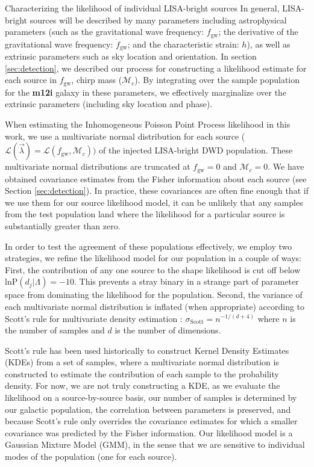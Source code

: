 \documentclass[twocolumn]{aastex631}
\newcommand*{\pprob}{\mathrm{P}}
\newcommand*{\gwL}{\mathcal{L}}
\newcommand*{\BinaryParameters}{\vec{\lambda}}
\newcommand*{\FormationParameters}{\Lambda}
\newcommand*{\gwdetj}{d_j}
\newcommand*\mc{\mathcal{M}_c}
\newcommand*{\fgw}{f_{\mathrm{gw}}}
\begin{document}
\begin{subsection}{Characterizing the likelihood of individual LISA-bright sources}
In general, LISA-bright sources will be described by
    many parameters including astrophysical parameters
    (such as the gravitational wave frequency: $\fgw$;
    the derivative of the gravitational wave frequency: $\dot{f}_{\mathrm{gw}}$;
    and the characteristic strain: $h$),
    as well as extrinsic parameters such as sky location
    and orientation.
In section \ref{sec:detection}, we described our process
    for constructing a likelihood estimate for each source in
    $\fgw$, chirp mass ($\mc$).
By integrating over the sample population for the \textbf{m12i} galaxy
    in these parameters,
    we effectively marginalize over the extrinsic parameters
    (including sky location and phase).

When estimating the Inhomogeneous Poisson Point Process likelihood
    in this work,
    we use a multivariate normal distribution for each source
    ($\gwL(\BinaryParameters) = \gwL(\fgw, \mc))$ of the injected 
    LISA-bright DWD population.
These multivariate normal distributions are truncated at 
    $\fgw = 0$ and $\mc = 0$.
We have obtained covariance estimates from the Fisher
    information about each source (see Section \ref{sec:detection}).
In practice, these covariances are often fine enough that if we use
    them for our source likelihood model,
    it can be unlikely that any samples from the test population
    land where the likelihood for a particular source is
    substantially greater than zero.

In order to test the agreement of these populations effectively,
    we employ two strategies, we refine the likelihood model for our population
    in a couple of ways:
First, the contribution of any one source
    to the shape likelihood is cut off below 
    $\mathrm{ln}\pprob(\gwdetj | \FormationParameters) = -10$.
This prevents a stray binary in a strange part of parameter space 
    from dominating the likelihood for the population.
Second, the variance of each multivariate normal distribution
    is inflated (when appropriate) according to Scott's rule for multivariate
    density estimation \citep{scotts-rule}:
    $\sigma_{\mathrm{Scott}} = n^{-1 / (d + 4)}$
    where $n$ is the number of samples and $d$ is the number of dimensions.

Scott's rule has been used historically to 
    construct Kernel Density Estimates (KDEs) from a set of samples,
    where a multivariate normal distribution is constructed to estimate the
    contribution of each sample to the probability density.
For now, we are not truly constructing a KDE, as
    we evaluate the likelihood on a source-by-source basis,
    our number of samples is determined by our galactic population,
    the correlation between parameters is preserved,
    and because Scott's rule only overrides the covariance estimates
    for which a smaller covariance was predicted by the Fisher information.
Our likelihood model is a Gaussian Mixture Model (GMM),
    in the sense that we are sensitive to
    individual modes of the population (one for each source).

\end{subsection}
\end{document}
